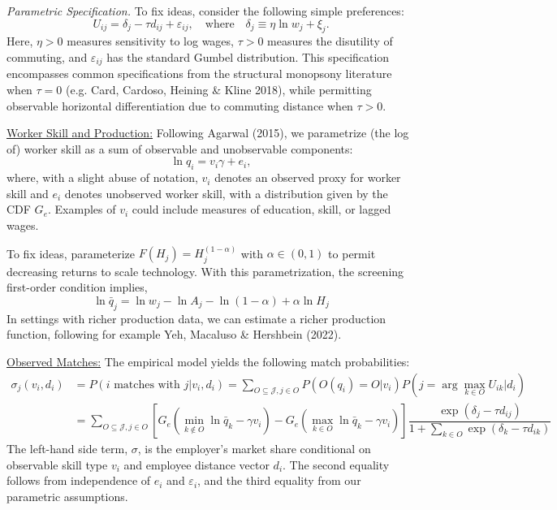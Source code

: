 \documentclass[11pt]{article}
\begin{document}
 

\textit{Parametric Specification.} To fix ideas, consider the following simple preferences:
\begin{equation}
    U_{ij} = \delta_j - \tau d_{ij} + \varepsilon_{ij}, \quad \text{where} \quad \delta_j \equiv \eta \ln w_j + \xi_j.
\end{equation}
Here, $\eta > 0$ measures sensitivity to log wages, $\tau > 0$ measures the disutility of commuting, and $\varepsilon_{ij}$ has the standard Gumbel distribution. This specification encompasses common specifications from the structural monopsony literature when $\tau=0$ (e.g. Card, Cardoso, Heining \& Kline 2018), while permitting observable horizontal differentiation due to commuting distance when $\tau > 0$. 

\underline{Worker Skill and Production:} Following Agarwal (2015), we parametrize (the log of) worker skill as a sum of observable and unobservable components:
$$
\ln q_i = v_i \gamma + e_i, 
$$
where, with a slight abuse of notation, $v_i$ denotes an observed proxy for worker skill and $e_i$ denotes unobserved worker skill, with a distribution given by the CDF $G_e$. Examples of $v_i$ could include measures of education, skill, or lagged wages.

To fix ideas, parameterize $F(H_j) = H_j^{(1-\alpha)}$ with $\alpha \in (0,1)$ to permit decreasing returns to scale technology. With this parametrization, the screening first-order condition implies, 
$$\ln \bar q_j = \ln w_j -  \ln A_j - \ln (1-\alpha) + \alpha \ln H_j$$ 
In settings with richer production data, we can estimate  a richer production function, following for example Yeh, Macaluso \& Hershbein (2022).



\underline{Observed Matches:} The empirical model yields the following match probabilities:
\begin{equation}
    \begin{split}
    \sigma_j(v_i,d_i) &= P\left(i\text{ matches with }j| v_i, d_i\right) = \sum_{O\subseteq \mathcal J, j\in O} P\left(O(q_i) = O | v_i \right) P\left(j = \arg\max_{k\in O} U_{ik} | d_i\right) \\
                    &= \sum_{O\subseteq \mathcal J, j\in O} \left[G_e\left(\min_{k\not\in O} \ln \bar q_k - \gamma v_i\right) - G_e\left(\max_{k\in O} \ln \bar q_k - \gamma v_i\right)\right]  \dfrac{\exp(\delta_j - \tau d_{ij})}{1+\sum_{k\in O} \exp(\delta_k- \tau d_{ik})}
    \end{split}
    \label{eq:shares}
\end{equation}
The left-hand side term, $\sigma$, is the employer's market share conditional on observable skill type $v_i$ and employee distance vector $d_i$. The second equality follows from independence of $e_i$ and $\varepsilon_i$, and the third equality from our parametric assumptions.
\end{document}
